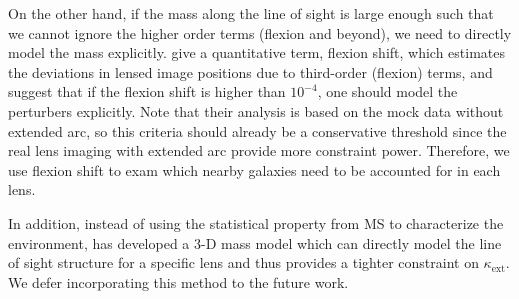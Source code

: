 \documentclass[useAMS,usenatbib]{mnras}
\newcommand\rxj{RXJ\,1131$-$1231}
\newcommand\he{HE\,0435$-$1223}
\newcommand\pg{PG\,1115$+$080}
\newcommand{\Ddt}{D_{\Delta t}}
\begin{document}
On the other hand, if the mass along the line of sight is large enough such that we cannot ignore the higher order terms (flexion and beyond), we need to directly model the mass explicitly.
\citet{McCullyEtal14,McCullyEtal17} give a quantitative term, flexion shift, which estimates the deviations in lensed image positions due to third-order (flexion) terms, and suggest that if the flexion shift is higher than $10^{-4}$, one should model the perturbers explicitly. 
Note that their analysis is based on the mock data without extended arc, so this criteria should already be a conservative threshold since the real lens imaging with extended arc provide more constraint power. 
Therefore, we use flexion shift to exam which nearby galaxies need to be accounted for in each lens. 

In addition, instead of using the statistical property from MS to characterize the environment, \citet{McCullyEtal17} has developed a 3-D mass model which can directly model the line of sight structure for a specific lens and thus provides a tighter constraint on $\kappa_{\textrm{ext}}$.  We defer incorporating this method to the future work.
\end{document}
